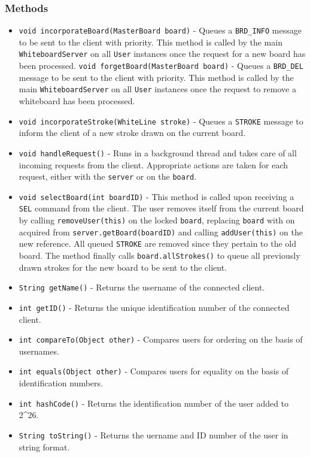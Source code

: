 \subsubsection{Methods}
\begin{itemize}
\item \texttt{void incorporateBoard(MasterBoard board)} - Queues a \texttt{BRD\_INFO} message to be sent to the client with priority. This method is called by the main \texttt{WhiteboardServer} on all \texttt{User} instances once the request for a new board has been processed.
\texttt{void forgetBoard(MasterBoard board)} - Queues a \texttt{BRD\_DEL} message to be sent to the client with priority. This method is called by the main \texttt{WhiteboardServer} on all \texttt{User} instances once the request to remove a whiteboard has been processed.
\item \texttt{void incorporateStroke(WhiteLine stroke)} - Queues a \texttt{STROKE} message to inform the client of a new stroke drawn on the current board.
\item \texttt{void handleRequest()} - Runs in a background thread and takes care of all incoming requests from the client. Appropriate actions are taken for each request, either with the \texttt{server} or on the \texttt{board}.
\item \texttt{void selectBoard(int boardID)} - This method is called upon receiving a \texttt{SEL} command from the client. The user removes itself from the current board by calling \texttt{removeUser(this)} on the locked \texttt{board}, replacing \texttt{board} with on acquired from \texttt{server.getBoard(boardID)} and calling \texttt{addUser(this)} on the new reference. All queued \texttt{STROKE} are removed since they pertain to the old board. The method finally calls \texttt{board.allStrokes()} to queue all previously drawn strokes for the new board to be sent to the client.
\item \texttt{String getName()} - Returns the username of the connected client.
\item \texttt{int getID()} - Returns the unique identification number of the connected client.
\item \texttt{int compareTo(Object other)} - Compares users for ordering on the basis of usernames.
\item \texttt{int equals(Object other)} - Compares users for equality on the basis of identification numbers.
\item \texttt{int hashCode()} - Returns the identification number of the user added to 2^{26}.
\item \texttt{String toString()} - Returns the uername and ID number of the user in string format.
\end{itemize}


